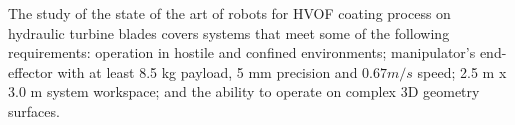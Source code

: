 The study of the state of the art of robots for HVOF coating process on
hydraulic turbine blades covers systems that meet some of the following
requirements:
operation in hostile and confined environments; manipulator's end-effector with
at least 8.5 kg payload, 5 mm precision and $0.67 m/s$ speed; 2.5 m x 3.0 m
system workspace; and the ability to operate on complex 3D geometry surfaces.


